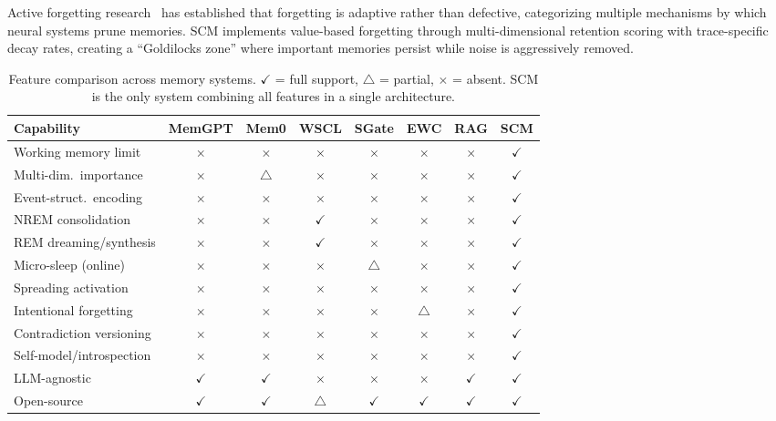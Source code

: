 \documentclass[11pt,twocolumn]{article}
\begin{document}
Active forgetting research~\cite{sha2024forgetting} has established that forgetting is adaptive rather than defective, categorizing multiple mechanisms by which neural systems prune memories. SCM implements value-based forgetting through multi-dimensional retention scoring with trace-specific decay rates, creating a ``Goldilocks zone'' where important memories persist while noise is aggressively removed.

\begin{table}[t]
\centering
\caption{Feature comparison across memory systems. $\checkmark$ = full support, $\triangle$ = partial, $\times$ = absent. SCM is the only system combining all features in a single architecture.}
\label{tab:features}
{\footnotesize
\begin{tabular}{@{}lccccccc@{}}
\toprule
\textbf{Capability} & \textbf{MemGPT} & \textbf{Mem0} & \textbf{WSCL} & \textbf{SGate} & \textbf{EWC} & \textbf{RAG} & \textbf{SCM} \\
\midrule
Working memory limit         & $\times$ & $\times$ & $\times$ & $\times$ & $\times$ & $\times$ & $\checkmark$ \\
Multi-dim.\ importance       & $\times$ & $\triangle$ & $\times$ & $\times$ & $\times$ & $\times$ & $\checkmark$ \\
Event-struct.\ encoding       & $\times$ & $\times$ & $\times$ & $\times$ & $\times$ & $\times$ & $\checkmark$ \\
NREM consolidation            & $\times$ & $\times$ & $\checkmark$ & $\times$ & $\times$ & $\times$ & $\checkmark$ \\
REM dreaming/synthesis        & $\times$ & $\times$ & $\checkmark$ & $\times$ & $\times$ & $\times$ & $\checkmark$ \\
Micro-sleep (online)          & $\times$ & $\times$ & $\times$ & $\triangle$ & $\times$ & $\times$ & $\checkmark$ \\
Spreading activation          & $\times$ & $\times$ & $\times$ & $\times$ & $\times$ & $\times$ & $\checkmark$ \\
Intentional forgetting        & $\times$ & $\times$ & $\times$ & $\times$ & $\triangle$ & $\times$ & $\checkmark$ \\
Contradiction versioning      & $\times$ & $\times$ & $\times$ & $\times$ & $\times$ & $\times$ & $\checkmark$ \\
Self-model/introspection      & $\times$ & $\times$ & $\times$ & $\times$ & $\times$ & $\times$ & $\checkmark$ \\
LLM-agnostic                  & $\checkmark$ & $\checkmark$ & $\times$ & $\times$ & $\times$ & $\checkmark$ & $\checkmark$ \\
Open-source                   & $\checkmark$ & $\checkmark$ & $\triangle$ & $\checkmark$ & $\checkmark$ & $\checkmark$ & $\checkmark$ \\
\bottomrule
\end{tabular}}
\vspace{-0.2cm}
\end{table}
\end{document}
